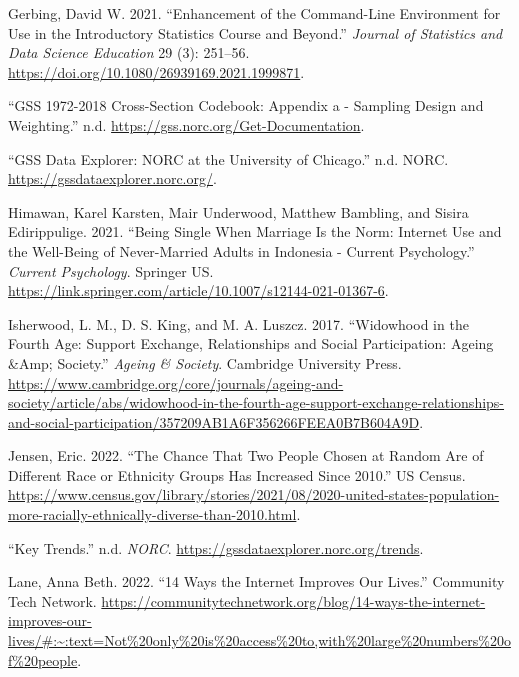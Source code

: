 \documentclass[
]{article}
\newlength{\cslhangindent}
\newlength{\cslentryspacingunit} %
\newenvironment{CSLReferences}[2] %
 {%
  \setlength{\parindent}{0pt}
  \ifodd #1
  \let\oldpar\par
  \def\par{\hangindent=\cslhangindent\oldpar}
  \fi
  \setlength{\parskip}{#2\cslentryspacingunit}
 }%
 {}
\begin{document}
\begin{CSLReferences}{1}{0}
\leavevmode{}%
Gerbing, David W. 2021. {``Enhancement of the Command-Line Environment
for Use in the Introductory Statistics Course and Beyond.''}
\emph{Journal of Statistics and Data Science Education} 29 (3): 251--56.
\url{https://doi.org/10.1080/26939169.2021.1999871}.

\leavevmode{}%
{``GSS 1972-2018 Cross-Section Codebook: Appendix a - Sampling Design
and Weighting.''} n.d. \url{https://gss.norc.org/Get-Documentation}.

\leavevmode{}%
{``GSS Data Explorer: NORC at the University of Chicago.''} n.d. NORC.
\url{https://gssdataexplorer.norc.org/}.

\leavevmode{}%
Himawan, Karel Karsten, Mair Underwood, Matthew Bambling, and Sisira
Edirippulige. 2021. {``Being Single When Marriage Is the Norm: Internet
Use and the Well-Being of Never-Married Adults in Indonesia - Current
Psychology.''} \emph{Current Psychology}. Springer US.
\url{https://link.springer.com/article/10.1007/s12144-021-01367-6}.

\leavevmode{}%
Isherwood, L. M., D. S. King, and M. A. Luszcz. 2017. {``Widowhood in
the Fourth Age: Support Exchange, Relationships and Social
Participation: Ageing \&Amp; Society.''} \emph{Ageing \& Society}.
Cambridge University Press.
\url{https://www.cambridge.org/core/journals/ageing-and-society/article/abs/widowhood-in-the-fourth-age-support-exchange-relationships-and-social-participation/357209AB1A6F356266FEEA0B7B604A9D}.

\leavevmode{}%
Jensen, Eric. 2022. {``The Chance That Two People Chosen at Random Are
of Different Race or Ethnicity Groups Has Increased Since 2010.''} US
Census.
\url{https://www.census.gov/library/stories/2021/08/2020-united-states-population-more-racially-ethnically-diverse-than-2010.html}.

\leavevmode{}%
{``Key Trends.''} n.d. \emph{NORC}.
\url{https://gssdataexplorer.norc.org/trends}.

\leavevmode{}%
Lane, Anna Beth. 2022. {``14 Ways the Internet Improves Our Lives.''}
Community Tech Network.
\url{https://communitytechnetwork.org/blog/14-ways-the-internet-improves-our-lives/\#:~:text=Not\%20only\%20is\%20access\%20to,with\%20large\%20numbers\%20of\%20people}.


\end{CSLReferences}
\end{document}
